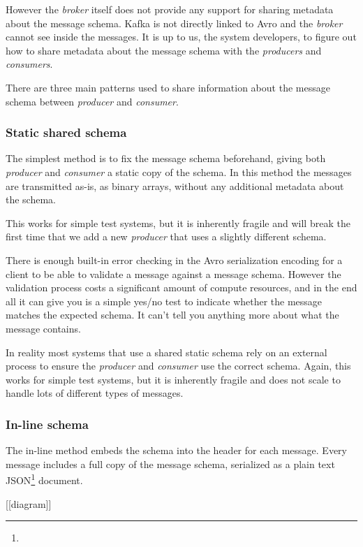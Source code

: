 \documentclass{article}
\newcommand{\json} {JSON\xspace}
\newcommand{\avro} {Avro\xspace}
\newcommand{\kafka} {Kafka\xspace}
\newcommand{\kfbroker} {\textit{broker}\xspace}
\newcommand{\kfconsumer} {\textit{consumer}\xspace}
\newcommand{\kfconsumers} {\textit{consumers}\xspace}
\newcommand{\kfproducer} {\textit{producer}\xspace}
\newcommand{\kfproducers} {\textit{producers}\xspace}
\newcommand{\footurl}[1] {\footnote{\burl{#1}}}
\begin{document}
However the \kafa \kfbroker itself does not provide any support for sharing metadata about the message schema. \kafka is not directly linked to \avro and the \kfbroker cannot see inside the messages. It is up to us, the system developers, to figure out how to share metadata about the message schema with the \kfproducers and \kfconsumers. 

There are three main patterns used to share information about the message schema between \kfproducer and \kfconsumer.

\subsubsection{Static shared schema}
\label{avro-static-schema}

The simplest method is to fix the message schema beforehand, giving both \kfproducer and \kfconsumer a static copy of the schema.  In this method the  messages are transmitted as-is, as binary arrays, without any additional metadata about the schema.

This works for simple test systems, but it is inherently fragile and will break the first time that we add a new  \kfproducer that uses a slightly different schema.

There is enough built-in error checking in the \avro serialization encoding for a client to be able to validate a message against a message schema. However the validation process costs a significant amount of compute resources, and in the end all it can give you is a simple yes/no test to indicate whether the message matches the expected schema. It can't tell you anything more about what the message contains.

In reality most systems that use a shared static schema rely on an external process to ensure the \kfproducer and \kfconsumer use the correct schema. Again, this works for simple test systems, but it is inherently fragile and does not scale to handle lots of different types of messages.

\subsubsection{In-line schema}
\label{avro-inline-schema}

The in-line method embeds the schema into the header for each message.
Every message includes a full copy of the message schema, serialized as a plain text \json\footurl{https://www.json.org/} document.

    [[diagram]]
\end{document}
